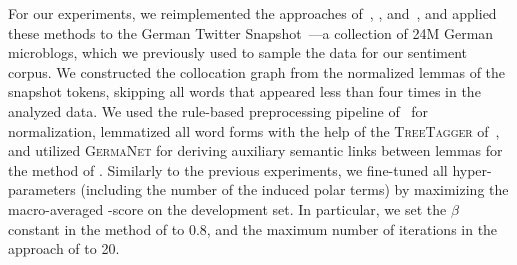 For our experiments, we reimplemented the approaches
of~\citet{Takamura:05}, \citet{Velikovich:10}, \citet{Kiritchenko:14}
and~\citet{Severyn:15}, and applied these methods to the German
Twitter Snapshot~\cite{Scheffler:14}---a collection of 24M German
microblogs, which we previously used to sample the data for our
sentiment corpus.  We constructed the collocation graph from the
normalized lemmas of the snapshot tokens, skipping all words that
appeared less than four times in the analyzed data.  We used the
rule-based preprocessing pipeline of~\citet{Sidarenka:13} for
normalization, lemmatized all word forms with the help of the
\textsc{TreeTagger} of~\citet{Schmid:95}, and utilized
\textsc{GermaNet} for deriving auxiliary semantic links between lemmas
for the method of \citet{Takamura:05}.  Similarly to the previous
experiments, we fine-tuned all hyper-parameters (including the number
of the induced polar terms) by maximizing the macro-averaged
\F{}-score on the development set.  In particular, we set the $\beta$
constant in the method of \citet{Takamura:05} to 0.8, and the maximum
number of iterations in the approach of \citet{Velikovich:10} to 20.



